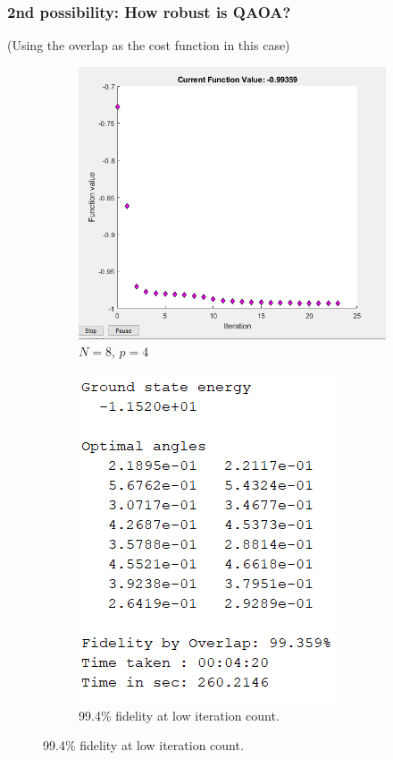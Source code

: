 \documentclass{beamer}
\theoremstyle{definition}
\begin{document}

\begin{frame}
\frametitle{2nd possibility: How robust is QAOA?}


(Using the overlap as the cost function in this case)



\begin{figure}[!htb]
	\centering
	\begin{subfigure}{0.5 \textwidth}
		\centering
		\includegraphics[scale=0.35]{N_8_p_4.PNG}
		\caption{$N=8$, $p=4$}
	\end{subfigure}%
	\begin{subfigure}{0.5 \textwidth}
		\centering
		\includegraphics[scale=0.46]{N_8_p_4_out}
		\caption{99.4\% fidelity at low iteration count.}
	\end{subfigure}
\end{figure}

\end{frame}
\end{document}
